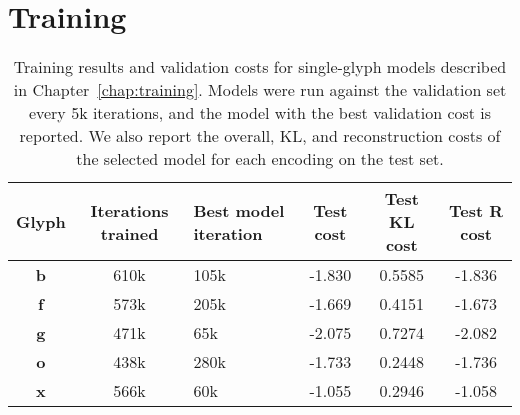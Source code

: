 \chapter{Training}\label{app:train}

\begin{table}[h]
\centering
    \caption[Training results for the single-glyph models]{Training results  and validation costs for single-glyph models described in Chapter~\ref{chap:training}.
    Models were run against the validation set every 5k iterations, and the model with the best validation cost is reported.
    We also report the overall, KL, and reconstruction costs of the selected model for each encoding on the test set.
    \label{apptbl:train-models}}
\begin{tabularx}{\textwidth}{c c X c c c}
\toprule
    Glyph & Iterations trained & Best model iteration & Test cost & Test KL cost & Test R cost \\ \midrule
    \textbf{b} & 610k & 105k & -1.830 & 0.5585 & -1.836 \\
    \textbf{f} & 573k & 205k & -1.669 & 0.4151 & -1.673 \\
    \textbf{g} & 471k & 65k & -2.075 & 0.7274 & -2.082 \\
    \textbf{o} & 438k & 280k & -1.733 & 0.2448 & -1.736 \\
    \textbf{x} & 566k & 60k & -1.055 & 0.2946 & -1.058 \\
\end{tabularx}
\end{table}

